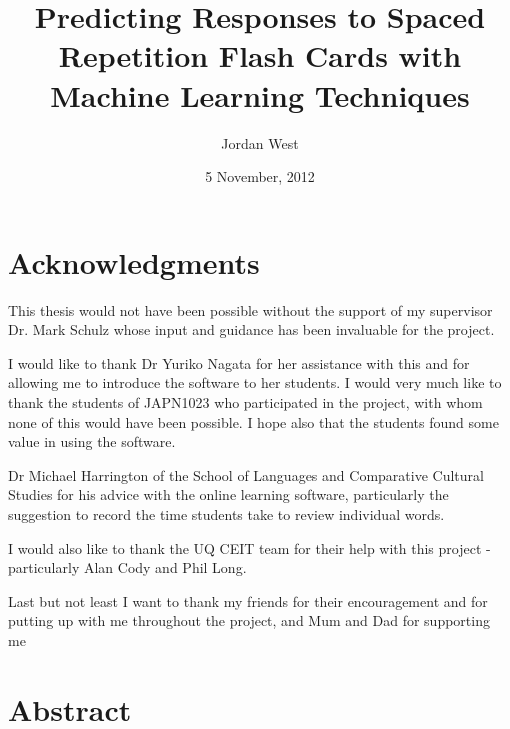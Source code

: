 \documentclass[12pt,a4paper,twoside,openright]{book}
\title{Predicting Responses to Spaced Repetition Flash Cards with Machine Learning Techniques}
\date{5 November, 2012}
\author{Jordan West}
\begin{document}
\frontmatter


\cleardoublepage



\chapter*{Acknowledgments}
This thesis would not have been possible without the support of my
supervisor Dr. Mark Schulz whose input and guidance
has been invaluable for the project.

I would like to thank Dr Yuriko Nagata for her assistance with this and for allowing
me to introduce the software to her students. I would very much like to thank the students
of JAPN1023 who participated in the project, with whom none of this would have been possible.
I hope also that the students found some value in using the software.

Dr Michael Harrington of the School of Languages and Comparative Cultural Studies
for his advice with the online learning software, particularly the suggestion
to record the time students take to review individual words.

I would also like to thank the UQ CEIT team for their help with this project -
particularly Alan Cody and Phil Long.

Last but not least I want to thank my friends for their encouragement and
for putting up with me throughout the project, and Mum and Dad for supporting me

\chapter*{Abstract}
\newpage

\tableofcontents

\mainmatter









%
%
\printbibliography

\appendix
\end{document}
